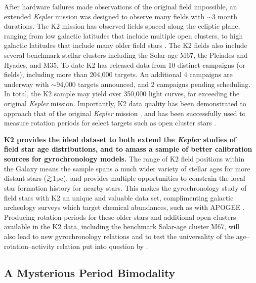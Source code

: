\documentclass[12pt]{article}
\newcommand{\Kepler}{\textsl{Kepler}\xspace}
\def\gtrsim{\mathrel{\hbox{\rlap{\hbox{\lower3pt\hbox{$\sim$}}}\hbox{\raise2pt\hbox{$>$}}}}}
\begin{document}
After hardware failures made observations of the original field impossible, an extended \Kepler mission was designed to observe many fields with $\sim$3 month durations. The K2 mission has observed fields spaced along the ecliptic plane, ranging from low galactic latitudes that include multiple open clusters, to high galactic latitudes that include many older field stars \citep{howell2014}. The K2 fields also include several benchmark stellar clusters including the Solar-age M67, the Pleiades and Hyades, and M35. To date K2 has released data from 10 distinct campaigns (or fields), including more than 204,000 targets. An additional 4 campaigns are underway with $\sim$94,000 targets announced, and 2 campaigns pending scheduling. In total, the K2 sample may yield over 350,000 light curves, far exceeding the original \Kepler mission. Importantly, K2 data quality has been demonstrated to approach that of the original \Kepler mission \citep{luger2016}, and has been successfully used to measure rotation periods for select targets such as open cluster stars \citep[e.g.][]{douglas2017}.


\clearpage %
{\bf K2 provides the ideal dataset to both extend the \Kepler studies of field
star age distributions, and to amass a sample of better calibration sources
for gyrochronology models.} The range of K2 field positions within the Galaxy
means the sample spans a much wider variety of stellar ages for more distant
stars ($\gtrsim$1pc), and provides multiple opportunities to constrain the
local star formation history for nearby stars. This makes the gyrochronology
study of field stars with K2 an unique and valuable data set, complimenting
galactic archeology surveys which target chemical abundances, such as with
APOGEE \citep{hayden2014}.
Producing rotation periods for these older stars and additional open clusters available in the K2 data, including the benchmark Solar-age cluster M67, will also lead to new gyrochronology relations and to test the universality of the age--rotation--activity relation put into question by \citet{angus2015}.



\subsection{A Mysterious Period Bimodality}
\end{document}
